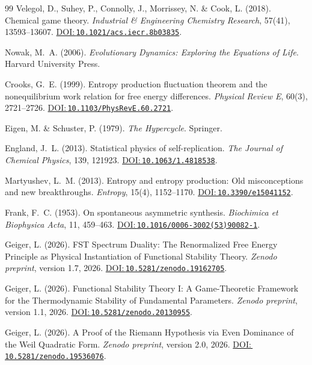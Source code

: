 \documentclass[12pt,a4paper]{article}
\newcommand{\doilink}[1]{\href{https://doi.org/#1}{DOI:\,\nolinkurl{#1}}}
\theoremstyle{remark}
\begin{document}
\begin{thebibliography}{99}
Velegol, D., Suhey, P., Connolly, J., Morrissey, N. \& Cook, L. (2018).
\newblock Chemical game theory.
\newblock \textit{Industrial \& Engineering Chemistry Research}, 57(41), 13593--13607.
\newblock \doilink{10.1021/acs.iecr.8b03835}.

Nowak, M.~A. (2006).
\newblock \textit{Evolutionary Dynamics: Exploring the Equations of Life}.
\newblock Harvard University Press.

Crooks, G.~E. (1999).
\newblock Entropy production fluctuation theorem and the nonequilibrium work relation for free energy differences.
\newblock \textit{Physical Review E}, 60(3), 2721--2726.
\newblock \doilink{10.1103/PhysRevE.60.2721}.

Eigen, M. \& Schuster, P. (1979).
\newblock \textit{The Hypercycle}.
\newblock Springer.

England, J.~L. (2013).
\newblock Statistical physics of self-replication.
\newblock \textit{The Journal of Chemical Physics}, 139, 121923.
\newblock \doilink{10.1063/1.4818538}.

Martyushev, L.~M. (2013).
\newblock Entropy and entropy production: Old misconceptions and new breakthroughs.
\newblock \textit{Entropy}, 15(4), 1152--1170.
\newblock \doilink{10.3390/e15041152}.


Frank, F.~C. (1953).
\newblock On spontaneous asymmetric synthesis.
\newblock \textit{Biochimica et Biophysica Acta}, 11, 459--463.
\newblock \doilink{10.1016/0006-3002(53)90082-1}.

Geiger, L. (2026).
\newblock FST Spectrum Duality: The Renormalized Free Energy Principle as Physical Instantiation of Functional Stability Theory.
\newblock \textit{Zenodo preprint}, version 1.7, 2026.
\newblock \doilink{10.5281/zenodo.19162705}.

Geiger, L. (2026).
\newblock Functional Stability Theory I: A Game-Theoretic Framework for the Thermodynamic Stability of Fundamental Parameters.
\newblock \textit{Zenodo preprint}, version 1.1, 2026.
\newblock \doilink{10.5281/zenodo.20130955}.

Geiger, L. (2026).
\newblock A Proof of the Riemann Hypothesis via Even Dominance of the Weil Quadratic Form.
\newblock \textit{Zenodo preprint}, version 2.0, 2026.
\newblock \doilink{10.5281/zenodo.19536076}.


\end{thebibliography}
\end{document}
